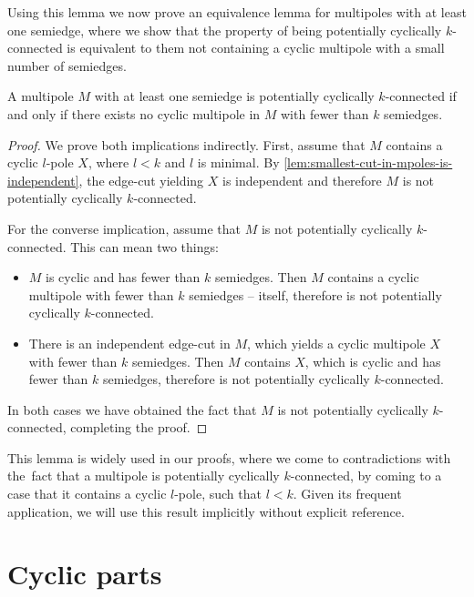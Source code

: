 \documentclass[12pt, twoside]{book}
\begin{document}
Using this lemma we now prove an equivalence lemma for multipoles with at least one semiedge, where we show that the property of being potentially cyclically \mbox{$k$-connected} is equivalent to them not containing a cyclic multipole with a small number of semiedges.

\begin{lemma}
	A multipole $M$ with at least one semiedge is potentially cyclically $k$-connected if and only if there exists no cyclic multipole in $M$ with fewer than $k$ semiedges.
\end{lemma}

\begin{proof}
	We prove both implications indirectly. First, assume that $M$ contains a cyclic \mbox{$l$-pole} $X$, where $l<k$ and $l$ is minimal. By \cref{lem:smallest-cut-in-mpoles-is-independent}, the edge-cut yielding $X$ is independent and therefore $M$ is not potentially cyclically $k$-connected.
	
	For the converse implication, assume that $M$ is not potentially cyclically $k$-connected. This can mean two things:
	\begin{itemize}
		\item $M$ is cyclic and has fewer than $k$ semiedges. Then $M$ contains a cyclic multipole with fewer than $k$ semiedges -- itself, therefore is not potentially cyclically \mbox{$k$-connected}.
		\item There is an independent edge-cut in $M$, which yields a cyclic multipole $X$ with fewer than $k$ semiedges. Then $M$ contains $X$, which is cyclic and has fewer than $k$ semiedges, therefore is not potentially cyclically $k$-connected.
	\end{itemize}
	
	In both cases we have obtained the fact that $M$ is not potentially cyclically \mbox{$k$-connected}, completing the proof.
\end{proof}

This lemma is widely used in our proofs, where we come to contradictions with the~fact that a multipole is potentially cyclically $k$-connected, by coming to a case that it contains a cyclic $l$-pole, such that $l<k$. Given its frequent application, we will use this result implicitly without explicit reference.

\section{Cyclic parts}\label{sec:cyclic-part-results}
\end{document}
